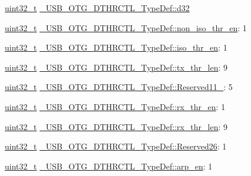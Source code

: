 \begin{DoxyCompactItemize}
\begin{tabbing}
\end{tabbing}\item 
\hyperlink{stdint_8h_a435d1572bf3f880d55459d9805097f62}{uint32\-\_\-t} \hyperlink{group___u_s_b___o_t_g___d_r_i_v_e_r_ga4c8322898391b3df3f8c2eaaaa831cd6}{\-\_\-\-U\-S\-B\-\_\-\-O\-T\-G\-\_\-\-D\-T\-H\-R\-C\-T\-L\-\_\-\-Type\-Def\-::d32}
\item 
\hyperlink{stdint_8h_a435d1572bf3f880d55459d9805097f62}{uint32\-\_\-t} \hyperlink{group___u_s_b___o_t_g___d_r_i_v_e_r_ga437a4ecc78a29535cb600a64f99fdded}{\-\_\-\-U\-S\-B\-\_\-\-O\-T\-G\-\_\-\-D\-T\-H\-R\-C\-T\-L\-\_\-\-Type\-Def\-::non\-\_\-iso\-\_\-thr\-\_\-en}\-: 1
\item 
\hyperlink{stdint_8h_a435d1572bf3f880d55459d9805097f62}{uint32\-\_\-t} \hyperlink{group___u_s_b___o_t_g___d_r_i_v_e_r_ga061c382bbfc6cb270dd9074511b6546b}{\-\_\-\-U\-S\-B\-\_\-\-O\-T\-G\-\_\-\-D\-T\-H\-R\-C\-T\-L\-\_\-\-Type\-Def\-::iso\-\_\-thr\-\_\-en}\-: 1
\item 
\hyperlink{stdint_8h_a435d1572bf3f880d55459d9805097f62}{uint32\-\_\-t} \hyperlink{group___u_s_b___o_t_g___d_r_i_v_e_r_ga567c6393ecd2b93a7bb261d16f56543a}{\-\_\-\-U\-S\-B\-\_\-\-O\-T\-G\-\_\-\-D\-T\-H\-R\-C\-T\-L\-\_\-\-Type\-Def\-::tx\-\_\-thr\-\_\-len}\-: 9
\item 
\hyperlink{stdint_8h_a435d1572bf3f880d55459d9805097f62}{uint32\-\_\-t} \hyperlink{group___u_s_b___o_t_g___d_r_i_v_e_r_gaf4fce312a08ead77b5fe741fcff35b5d}{\-\_\-\-U\-S\-B\-\_\-\-O\-T\-G\-\_\-\-D\-T\-H\-R\-C\-T\-L\-\_\-\-Type\-Def\-::\-Reserved11\-\_}\-: 5
\item 
\hyperlink{stdint_8h_a435d1572bf3f880d55459d9805097f62}{uint32\-\_\-t} \hyperlink{group___u_s_b___o_t_g___d_r_i_v_e_r_gabf30ccd0997e6301c6783cd50a71e599}{\-\_\-\-U\-S\-B\-\_\-\-O\-T\-G\-\_\-\-D\-T\-H\-R\-C\-T\-L\-\_\-\-Type\-Def\-::rx\-\_\-thr\-\_\-en}\-: 1
\item 
\hyperlink{stdint_8h_a435d1572bf3f880d55459d9805097f62}{uint32\-\_\-t} \hyperlink{group___u_s_b___o_t_g___d_r_i_v_e_r_ga17bd381e2313feab5337735207e2a93a}{\-\_\-\-U\-S\-B\-\_\-\-O\-T\-G\-\_\-\-D\-T\-H\-R\-C\-T\-L\-\_\-\-Type\-Def\-::rx\-\_\-thr\-\_\-len}\-: 9
\item 
\hyperlink{stdint_8h_a435d1572bf3f880d55459d9805097f62}{uint32\-\_\-t} \hyperlink{group___u_s_b___o_t_g___d_r_i_v_e_r_ga632ec9c8d1277a82227409d456d3f545}{\-\_\-\-U\-S\-B\-\_\-\-O\-T\-G\-\_\-\-D\-T\-H\-R\-C\-T\-L\-\_\-\-Type\-Def\-::\-Reserved26}\-: 1
\item 
\hyperlink{stdint_8h_a435d1572bf3f880d55459d9805097f62}{uint32\-\_\-t} \hyperlink{group___u_s_b___o_t_g___d_r_i_v_e_r_gabb5b2edd6a3c01d382137065e1277feb}{\-\_\-\-U\-S\-B\-\_\-\-O\-T\-G\-\_\-\-D\-T\-H\-R\-C\-T\-L\-\_\-\-Type\-Def\-::arp\-\_\-en}\-: 1

\end{DoxyCompactItemize}
